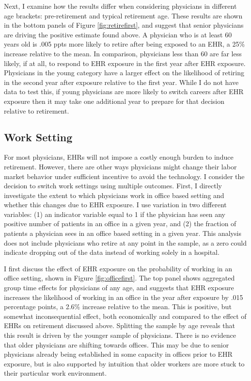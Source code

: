 \documentclass[11pt]{article}
\begin{document}
Next, I examine how the results differ when considering physicians in different age brackets: pre-retirement and typical retirement age. These results are shown in the bottom panels of Figure \ref{fig:retirefirst}, and suggest that senior physicians are driving the positive estimate found above. A physician who is at least 60 years old is .005 ppts more likely to retire after being exposed to an EHR, a 25\% increase relative to the mean. In comparison, physicians less than 60 are far less likely, if at all, to respond to EHR exposure in the first year after EHR exposure. Physicians in the young category have a larger effect on the likelihood of retiring in the second year after exposure relative to the first year. While I do not have data to test this, if young physicians are more likely to switch careers after EHR exposure then it may take one additional year to prepare for that decision relative to retirement.   



\subsection{Work Setting}

For most physicians, EHRs will not impose a costly enough burden to induce retirement. However, there are other ways physicians might change their labor market behavior under sufficient incentive to avoid the technology. I consider the decision to switch work settings using multiple outcomes. First, I directly investigate the extent to which physicians work in office based setting and whether this changes due to EHR exposure. I use variation in two different variables: (1) an indicator variable equal to 1 if the physician has seen any positive number of patients in an office in a given year, and (2) the fraction of patients a physician sees in an office based setting in a given year. This analysis does not include physicians who retire at any point in the sample, as a zero could indicate dropping out of the data instead of working solely in a hospital. 

I first discuss the effect of EHR exposure on the probability of working in an office setting, shown in Figure \ref{fig:officefirst}. The top panel shows aggregated group time effects for physicians of any age, and suggests that EHR exposure increases the likelihood of working in an office in the year after exposure by .015 percentage points, a 2.6\% increase relative to the mean. This is positive, but somewhat inconsequential effect, both economically and compared to the effect of EHRs on retirement discussed above. Splitting the sample by age reveals that this result is driven by the younger sample of physicians. There is no evidence that older physicians are shifting towards offices. This may be due to senior physicians already being established in some capacity in offices prior to EHR exposure, but is also supported by intuition that older workers are more stuck to their particular work environment. 
\end{document}
